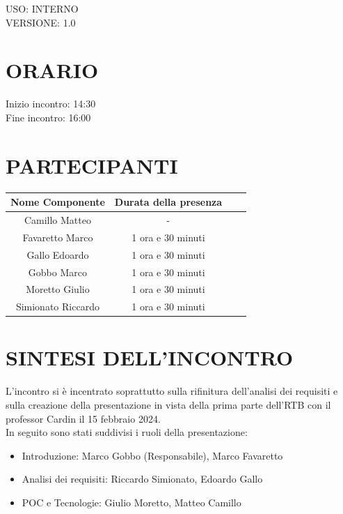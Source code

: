 \documentclass[5pt]{article}
\begin{document}
\begin{flushright}
    \begin{spacing}{1}
        USO: INTERNO\\
        VERSIONE: 1.0\\ %
    \end{spacing}
\end{flushright}


\restoregeometry

\pagebreak


\section{\Large ORARIO}
\begin{spacing}{1.5}
    {\large Inizio incontro: 14:30}\\
    {\large Fine incontro: 16:00}
\end{spacing}

\section{PARTECIPANTI}
\setlength\cellspacetoplimit{6pt}
\setlength\cellspacebottomlimit{6pt}

\begin{table}[ht]
  \begin{tabular}{|Sc|Sc|}
    \hline
    \textbf{Nome Componente} & \textbf{Durata della presenza} \\
    \hline
    Camillo Matteo & - \\
    Favaretto Marco & 1 ora e 30 minuti \\
    Gallo Edoardo & 1 ora e 30 minuti \\
    Gobbo Marco & 1 ora e 30 minuti \\
    Moretto Giulio & 1 ora e 30 minuti \\
    Simionato Riccardo & 1 ora e 30 minuti \\
    \hline
  \end{tabular}
  \label{tab:conference}
\end{table}

\section{SINTESI DELL'INCONTRO}
L'incontro si è incentrato soprattutto sulla rifinitura dell'analisi dei requisiti e sulla creazione della presentazione in vista della prima parte dell'RTB con il professor Cardin il 15 febbraio 2024.\\
In seguito sono stati suddivisi i ruoli della presentazione:
\begin{itemize}
	\item Introduzione: Marco Gobbo (Responsabile), Marco Favaretto
	\item Analisi dei requisiti: Riccardo Simionato, Edoardo Gallo
	\item POC e Tecnologie: Giulio Moretto, Matteo Camillo
\end{itemize}
\end{document}
